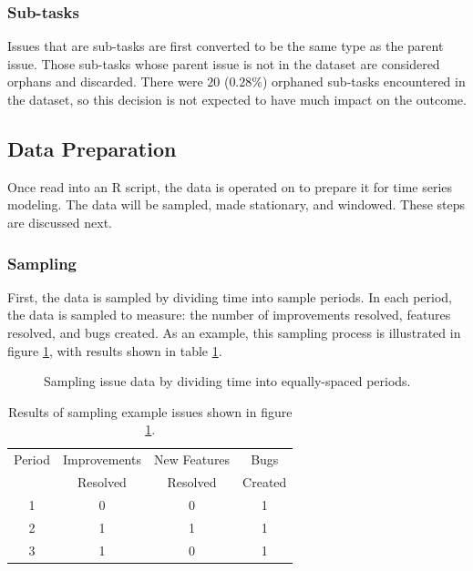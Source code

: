 \documentclass[a4paper]{scrartcl}
\begin{document}
\subsubsection*{Sub-tasks}
Issues that are sub-tasks are first converted to be the same type as the parent issue. Those sub-tasks whose parent issue is not in the dataset are considered orphans and discarded. There were $20$ ($0.28\%$) orphaned sub-tasks encountered in the dataset, so this decision is not expected to have much impact on the outcome.

\subsection*{Data Preparation}
Once read into an R script, the data is operated on to prepare it for time series modeling. The data will be sampled, made stationary, and windowed. These steps are discussed next.

\subsubsection*{Sampling}

First, the data is sampled by dividing time into sample periods. In each period, the data is sampled to measure: the number of improvements resolved, features resolved, and bugs created. As an example, this sampling process is illustrated in figure \ref{fig:sampling_issue_data}, with results shown in table \ref{tab:sampling_issue_data}.

\begin{figure}[h!]
\begin{center}
\caption{Sampling issue data by dividing time into equally-spaced periods.}
\label{fig:sampling_issue_data}
\end{center}
\end{figure}

\begin{table}[h!]
\caption{Results of sampling example issues shown in figure \ref{fig:sampling_issue_data}.}
\centering
\begin{tabular}{ c | c | c | c }
\hline
Period & Improvements & New Features & Bugs \\
~& Resolved & Resolved & Created \\
\hline
1 & 0 & 0 & 1 \\
2 & 1 & 1 & 1 \\
3 & 1 & 0 & 1 \\
\hline
\end{tabular}
\label{tab:sampling_issue_data}
\end{table}
\end{document}
